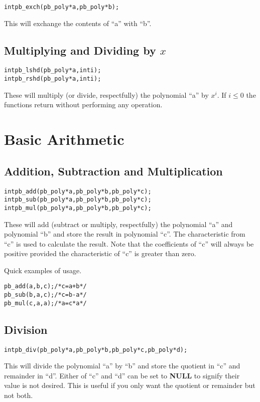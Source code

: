 \documentclass[b5paper]{book}
\begin{document}
\begin{alltt}
int pb_exch(pb_poly *a, pb_poly *b);
\end{alltt}
This will exchange the contents of ``a'' with ``b''.  

\section{Multiplying and Dividing by $x$}
 
\begin{alltt}
int pb_lshd(pb_poly *a, int i);
int pb_rshd(pb_poly *a, int i);
\end{alltt}
These will multiply (or divide, respectfully) the polynomial ``a'' by $x^i$.  If $i \le 0$ the functions return without
performing any operation.  

\chapter{Basic Arithmetic}
\section{Addition, Subtraction and Multiplication}
 
\begin{alltt}
int pb_add(pb_poly *a, pb_poly *b, pb_poly *c);
int pb_sub(pb_poly *a, pb_poly *b, pb_poly *c);
int pb_mul(pb_poly *a, pb_poly *b, pb_poly *c);
\end{alltt}

These will add (subtract or multiply, respectfully) the polynomial ``a'' and polynomial ``b'' and store the result in 
polynomial ``c''.  The characteristic from  ``c'' is used to calculate the result.  Note that the coefficients of ``c'' 
will always be positive provided the characteristic of ``c'' is greater than zero.  

Quick examples of usage.

\begin{alltt}
pb_add(a, b, c);  /* c = a + b */
pb_sub(b, a, c);  /* c = b - a */
pb_mul(c, a, a);  /* a = c * a */
\end{alltt}

\section{Division}
\begin{alltt}
int pb_div(pb_poly *a, pb_poly *b, pb_poly *c, pb_poly *d);
\end{alltt}
This will divide the polynomial ``a'' by ``b'' and store the quotient in ``c'' and remainder in ``d''.  Either of
``c'' and ``d'' can be set to \textbf{NULL} to signify their value is not desired.  This is useful if you only want the
quotient or remainder but not both.  
\end{document}
